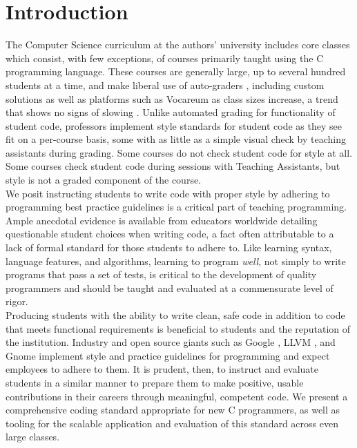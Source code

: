 \documentclass[sigconf]{acmart}
\begin{document}
\maketitle

\section{Introduction}
The Computer Science curriculum at the authors' university includes core classes which
consist, with few exceptions, of courses primarily taught using the C programming
language. These courses are generally large, up to several hundred students at a time,
and make liberal use of auto-graders \cite{doi:10.1080/08993400500150747},
including custom solutions as well as platforms such as Vocareum as class sizes increase,
a trend that shows no signs of slowing \cite{10.1145/2839509.2844616}. Unlike automated
grading for functionality of student code, professors implement style standards for
student code as they see fit on a per-course basis, some with as little as a simple
visual check by teaching assistants during grading. Some courses do not check student
code for style at all. Some courses check student code during sessions with Teaching
Assistants, but style is not a graded component of the course.
\\

We posit instructing students to write code with proper style by adhering to programming
best practice guidelines is a critical part of teaching programming. Ample anecdotal
evidence is available from educators worldwide detailing questionable student choices
when writing code, a fact often attributable to a lack of formal standard for those
students to adhere to. Like learning syntax, language features, and algorithms, learning
to program \textit{well}, not simply to write programs that pass a set of tests, is
critical to the development of quality programmers \cite{10.1145/3297156.3297227} and
should be taught and evaluated at a commensurate level of rigor.
\\

Producing students with the ability to write clean, safe code in addition to code that
meets functional requirements is beneficial to students and the reputation of the
institution. Industry and open source giants such as Google \cite{GoogleCStyleGuide},
LLVM \cite{LLVMStyleGuide}, and Gnome \cite{GnomeStyleGuide} implement style and practice
guidelines for programming and expect employees to adhere to them. It is prudent, then,
to instruct and evaluate students in a similar manner to prepare them to make positive,
usable contributions in their careers through meaningful, competent code. We present a
comprehensive coding standard appropriate for new C programmers, as well as tooling for
the scalable application and evaluation of this standard across even large classes.
\\
\end{document}
